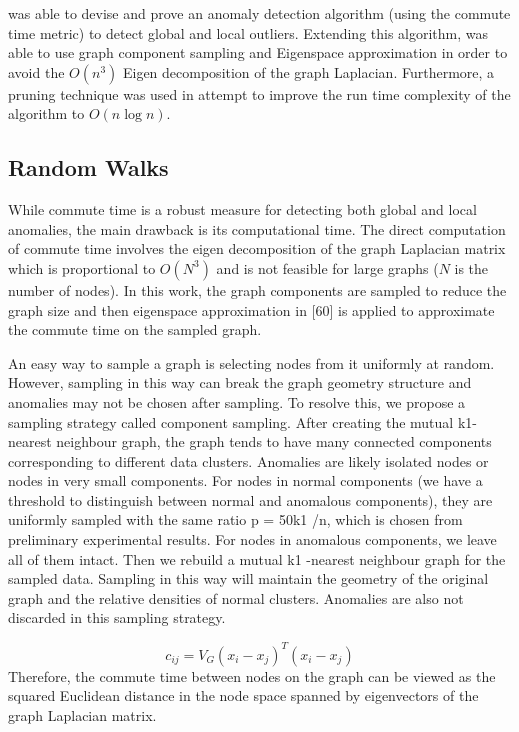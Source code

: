\citeauthor{Khoa:2012} was able to devise and prove an anomaly detection
algorithm (using the commute time metric) to detect global and local outliers.
Extending this algorithm, \citeauthor{Khoa:2012} was able to use graph component
sampling and Eigenspace approximation in order to avoid the $O(n^3)$ Eigen
decomposition of the graph Laplacian. Furthermore, a pruning technique was used
in attempt to improve the run time complexity of the algorithm to $O(n\log n)$.

\subsection{Random Walks}
\label{anomalyDetection::randomWalks}

\cite{Khoa:2012}
While commute time is a robust measure for detecting both global and local anomalies, the main drawback is its computational time. The direct computation of commute time involves the eigen decomposition of the graph Laplacian matrix which is proportional to $O(N^3)$ and is not feasible for large graphs ($N$ is the number of nodes). In this work, the graph components are sampled to reduce the graph size and then eigenspace approximation in [60] is applied to approximate the commute time on the sampled graph.

An easy way to sample a graph is selecting nodes from it uniformly at random. However, sampling in this way can break the graph geometry structure and anomalies may not be chosen after sampling. To resolve this, we propose a sampling strategy called component sampling. After creating the mutual k1-nearest neighbour graph, the graph tends to have many connected components corresponding to different data clusters.
Anomalies are likely isolated nodes or nodes in very small components. For nodes in normal components (we have a threshold to distinguish between normal and anomalous components), they are uniformly sampled with the same ratio p = 50k1 /n, which is chosen from preliminary experimental results. For nodes in anomalous components, we leave all of them intact. Then we rebuild a mutual k1 -nearest neighbour graph for
the sampled data. Sampling in this way will maintain the geometry of the original graph and the relative densities of normal clusters. Anomalies are also not discarded in this sampling strategy.

\begin{equation}
c_{ij} = V_G(x_i - x_j)^T (x_i - x_j)
\end{equation}
Therefore, the commute time between nodes on the graph can be viewed as the
squared Euclidean distance in the node space spanned by eigenvectors of the graph
Laplacian matrix.

